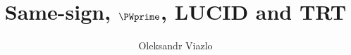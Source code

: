 \documentclass[hyperpdf,bindnopdf]{hepthesis}
\title{Same-sign, $\PWprime$, LUCID and TRT}
\author{Oleksandr Viazlo}
\begin{document}
%   

\tableofcontents


\begin{mainmatter}
%   
%   
  
%   
%   
%   
\end{mainmatter}

%   

\begin{backmatter}
  
\end{backmatter}

\end{document}
